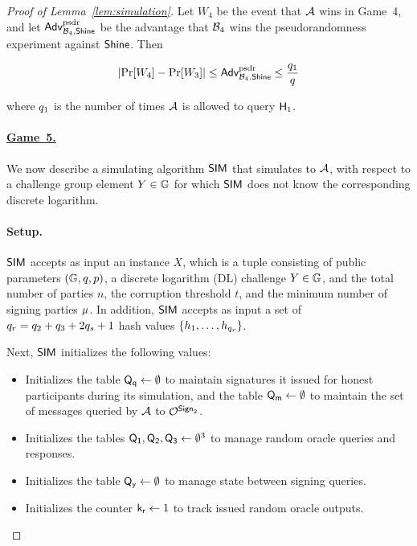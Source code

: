 \begin{proof}[Proof of Lemma~\ref{lem:simulation}]
  Let $W_4$ be the event that $\mathcal{A}$ wins in Game~4,
  and let $\textsf{\upshape Adv}^{\textrm{\upshape psdr}}_{\mathcal{B}_4, \mathsf{Shine}}$ be the advantage that $\mathcal{B}_4$ wins the pseudorandomness experiment against $\mathsf{Shine}$.
  Then

  \begin{equation} \label{eq:game4}
    \lvert \Pr[W_4] - \Pr[W_3] \rvert \leq  \textsf{\upshape Adv}^{\textrm{\upshape psdr}}_{\mathcal{B}_4, \mathsf{Shine}} \leq  \frac{q_1}{q}
  \end{equation}

  where $q_1$ is the number of times $\mathcal{A}$ is allowed to query $\mathsf{H}_1$.


  \paragraph{\underline{Game~5.}}
  We now describe a simulating algorithm $\mathsf{SIM}$ that simulates \glitter to  $\mathcal{A}$,
  with respect to a challenge group element $Y \in \mathbb{G}$ for which $\mathsf{SIM}$ does not know the corresponding discrete logarithm.

  \medskip

  \paragraph{Setup.}
  $\mathsf{SIM}$ accepts as input an instance $X$,
  which is a tuple consisting of public parameters $(\mathbb{G}, q, p)$,
  a discrete logarithm (DL) challenge $Y \in \mathbb{G}$,
  and the total number of parties $n$, the corruption threshold $t$, and the minimum number of signing parties $\mu$.
  In addition,
  $\mathsf{SIM}$ accepts as input a set of $q_r = q_2 + q_3 + 2q_s + 1$
  hash values $\{ h_1, \ldots, h_{q_r}\}$.


  Next, $\mathsf{SIM}$ initializes the following values:
  \begin{itemize}
    \item Initializes the table $\mathsf{Q_q} \gets \emptyset$ to maintain signatures it issued for honest participants during its simulation,
      and the table $\mathsf{Q_m} \gets \emptyset$ to maintain the set of messages queried by $\mathcal{A}$ to $\mathcal{O}^{\mathsf{Sign}_2}$.
    \item Initializes the tables $\mathsf{Q_1}, \mathsf{Q_2}, \mathsf{Q_3} \gets \emptyset^3$ to manage random oracle queries and responses.
    \item Initializes the table $\mathsf{Q_y} \gets \emptyset$ to manage state between signing queries.
    \item Initializes the counter $\mathsf{k_r} \gets 1$ to track issued random oracle outputs.
  \end{itemize}


\end{proof}

